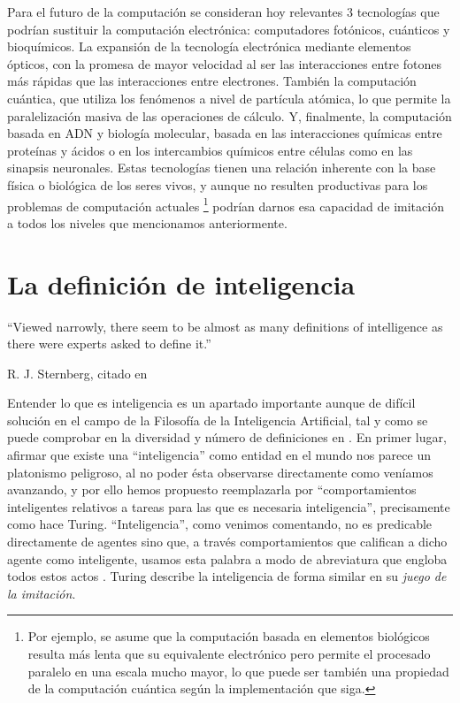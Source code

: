 \documentclass[12pt]{memoir}
\begin{document}
Para el futuro de la computación se consideran hoy relevantes 3 tecnologías que podrían sustituir la computación electrónica: computadores fotónicos, cuánticos y bioquímicos. La expansión de la tecnología electrónica mediante elementos ópticos, con la promesa de mayor velocidad al ser las interacciones entre fotones más rápidas que las interacciones entre electrones. También la computación cuántica, que utiliza los fenómenos a nivel de partícula atómica, lo que permite la paralelización masiva de las operaciones de cálculo. Y, finalmente, la computación basada en ADN y biología molecular, basada en las interacciones químicas entre proteínas y ácidos o en los intercambios químicos entre células como en las sinapsis neuronales. Estas tecnologías tienen una relación inherente con la base física o biológica de los seres vivos, y aunque no resulten productivas para los problemas de computación actuales \footnote{Por ejemplo, se asume que la computación basada en elementos biológicos resulta más lenta que su equivalente electrónico pero permite el procesado paralelo en una escala mucho mayor, lo que puede ser también una propiedad de la computación cuántica según la implementación que siga.} podrían darnos esa capacidad de imitación a todos los niveles que mencionamos anteriormente.


\chapter{La definición de inteligencia}
\label{intelligence}

\epigraph{``Viewed narrowly, there seem to be almost as many definitions of
intelligence as there were experts asked to define it.''}{R. J. Sternberg, citado en \cite{intDefs}}

Entender lo que es inteligencia es un apartado importante aunque de difícil solución en el campo de la Filosofía de la Inteligencia Artificial, tal y como se puede comprobar en la diversidad y número de definiciones en \parencite{intDefs}. En primer lugar, afirmar que existe una ``inteligencia'' como entidad en el mundo nos parece un platonismo peligroso, al no poder ésta observarse directamente como veníamos avanzando, y por ello hemos propuesto reemplazarla por ``comportamientos inteligentes relativos a tareas para las que es necesaria inteligencia'', precisamente como hace Turing. ``Inteligencia'', como venimos comentando, no es predicable directamente de agentes sino que, a través comportamientos que califican a dicho agente como inteligente, usamos esta palabra a modo de abreviatura que engloba todos estos actos \parencite{diamantAdvancesAI}. Turing describe la inteligencia de forma similar en su \textit{juego de la imitación}.
\end{document}
